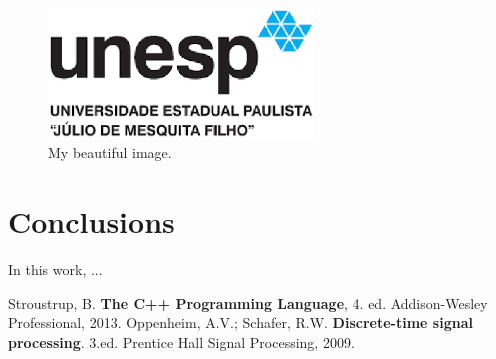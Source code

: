 \documentclass[a4paper,times,12pt]{article}
\begin{document}
\begin{figure}
\centering
\includegraphics[width=200pt]{unesp.eps}
\caption{My beautiful image.} 
\label{minhaimagem}
\end{figure}
\section{Conclusions}
\par In this work, ...
\begin{thebibliography}{00}
Stroustrup, B. \textbf{The C++ Programming Language}, 4. ed. Addison-Wesley Professional, 2013.
Oppenheim, A.V.; Schafer, R.W. \textbf{Discrete-time signal processing}. 3.ed. Prentice Hall Signal Processing, 2009. 
\end{thebibliography}
\end{document}
